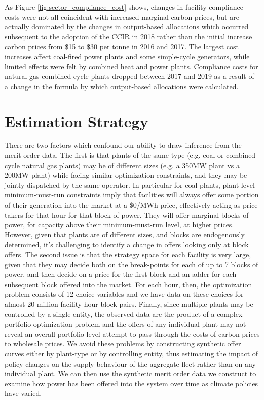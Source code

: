 \documentclass[12pt]{article}
\newcommand{\coe}{\text{CO$_2$e }}
\begin{document}
As Figure \ref{fig:sector_compliance_cost} shows, changes in facility compliance costs were not all coincident with increased marginal carbon prices, but are actually dominated by the changes in output-based allocations which occurred subsequent to the adoption of the CCIR in 2018 rather than the initial increase carbon prices from \$15 to \$30 per tonne \coe in 2016 and 2017. The largest cost increases affect coal-fired power plants and some simple-cycle generators, while limited effects were felt by combined heat and power plants. Compliance costs for natural gas combined-cycle plants dropped between 2017 and 2019 as a result of a change in the formula by which output-based allocations were calculated.


\section{Estimation Strategy}
There are two factors which confound our ability to draw inference from the merit order data. The first is that plants of the same type (e.g. coal or combined-cycle natural gas plants) may be of different sizes (e.g. a 350MW plant vs a 200MW plant) while facing similar optimization constraints, and they may be jointly dispatched by the same operator. In particular for coal plants, plant-level minimum-must-run constraints imply that facilities will always offer some portion of their generation into the market at a \$0/MWh price, effectively acting as price takers for that hour for that block of power. They will offer marginal blocks of power, for capacity above their minimum-must-run level, at higher prices. However, given that plants are of different sizes, and blocks are endogenously determined, it's challenging to identify a change in offers looking only at block offers. The second issue is that the strategy space for each facility is very large, given that they may decide both on the break-points for each of up to 7 blocks of power, and then decide on a price for the first block and an adder for each subsequent block offered into the market. For each hour, then, the optimization problem consists of 12 choice variables and we have data on these choices for almost 20 million facility-hour-block pairs. Finally, since multiple plants may be controlled by a single entity, the observed data are the product of a complex portfolio optimization problem and the offers of any individual plant may not reveal an overall portfolio-level attempt to pass through the costs of carbon prices to wholesale prices. We avoid these problems by constructing synthetic offer curves either by plant-type or by controlling entity, thus estimating the impact of policy changes on the supply behaviour of the aggregate fleet rather than on any individual plant. We can then use the synthetic merit order data we construct to examine how power has been offered into the system over time as climate policies have varied.
\end{document}
